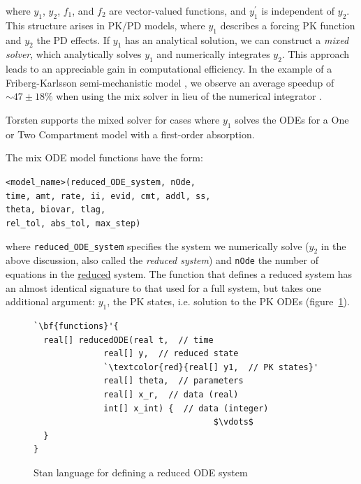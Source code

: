 \documentclass[11pt]{amsart}
\newenvironment{fmpage}[1]
     {\begin{lrbox}{\fmbox}\begin{minipage}{#1}}
     {\end{minipage}\end{lrbox}\fbox{\usebox{\fmbox}}}
\begin{document}
where $y_1$, $y_2$, $f_1$, and $f_2$ are vector-valued functions, and  $y_1^\prime$ is independent of $y_2$. This structure arises in PK/PD models, where $y_1$ describes a forcing PK function and $y_2$ the PD effects. If $y_1$ has an analytical solution, we can construct a \textit{mixed solver}, which analytically solves $y_1$ and numerically integrates $y_2$. This approach leads to an appreciable gain in computational efficiency. In the example of a Friberg-Karlsson semi-mechanistic model \cite{2364}, we observe an average speedup of $\sim 47 \pm 18 \%$ when using the mix solver in lieu of the numerical integrator \cite{Margossian:2017b}.

Torsten supports the mixed solver for cases where $y_1$ solves the ODEs for a One or Two Compartment model with a first-order absorption.

The mix ODE model functions have the form:

\texttt{<model\_name>(reduced\_ODE\_system, nOde, \\
\phantom{<model\_name>} time, amt, rate, ii, evid, cmt, addl, ss, \\
\phantom{<model\_name>} theta, biovar, tlag, \\                              
\phantom{<model\_name>} rel\_tol, abs\_tol, max\_step)}

where \texttt{reduced\_ODE\_system} specifies the system we  numerically solve ($y_2$ in the above discussion, also called the \textit{reduced system}) and \texttt{nOde} the number of equations in the \underline{reduced} system. The function that defines a reduced system has an almost identical signature to that used for a full system, but takes one additional argument: $y_1$, the PK states, i.e. solution to the PK ODEs (figure~\ref{reducedODESystem}).

\begin{figure}[htbp]
\caption{Stan language for defining a reduced ODE system}
\begin{center}
\begin{small}
\begin{fmpage}{\textwidth - .75in}
\begin{lstlisting}[basicstyle=\footnotesize\ttfamily,mathescape=true,flexiblecolumns=true,frame=single,escapeinside=`']
`\bf{functions}'{
  real[] reducedODE(real t,  // time
			  real[] y,  // reduced state
			  `\textcolor{red}{real[] y1,  // PK states}'
			  real[] theta,  // parameters
			  real[] x_r,  // data (real)
			  int[] x_int) {  // data (integer)	        
                                    $\vdots$			       
  }
}
\end{lstlisting}
\end{fmpage}
\end{small}
\end{center}
\label{reducedODESystem}
\end{figure}
\end{document}
